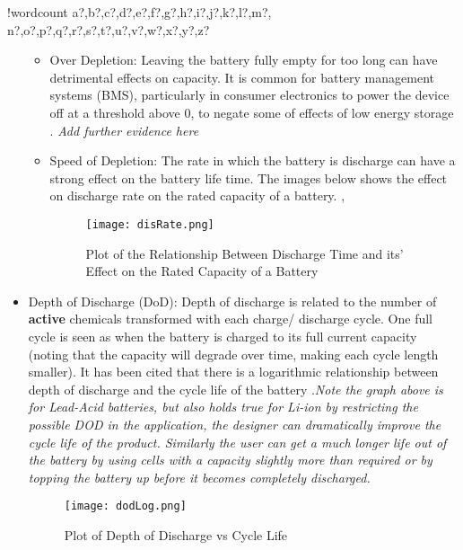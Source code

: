 \documentclass[fontsize=9.5pt]{extarticle}
\providecommand{\tightlist}{%
  \setlength{\itemsep}{0pt}\setlength{\parskip}{0pt}}
\newcounter{words}
\newenvironment{counted}{%
  \setcounter{words}{0}
  \SearchList!{wordcount}{\stepcounter{words}}
    {a?,b?,c?,d?,e?,f?,g?,h?,i?,j?,k?,l?,m?,
    n?,o?,p?,q?,r?,s?,t?,u?,v?,w?,x?,y?,z?}
  \UndoBoundary{'}
  \SearchOrder{p;}}{%
  \StopSearching}
\begin{document}
\begin{counted}
\begin{itemize}
  \begin{itemize}
  \tightlist
  \item
    Over Depletion: Leaving the battery fully empty for too long can
    have detrimental effects on capacity. It is common for battery
    management systems (BMS), particularly in consumer electronics to
    power the device off at a threshold above 0, to negate some of
    effects of low energy storage \cite{Prematur82:online}. \emph{Add
    further evidence here}
  \item
    Speed of Depletion: The rate in which the battery is discharge can
    have a strong effect on the battery life time. The images below
    shows the effect on discharge rate on the rated capacity of a
    battery. \cite{BatteryL10:online},\cite{Effectso69:online}

    \begin{figure}[H]
       \centering
       \texttt{[image: disRate.png]}
       \caption{Plot of the Relationship Between Discharge Time and its' Effect on the Rated Capacity of a Battery \cite{Effectso69:online}}
       \label{disRate}
     \end{figure}
  \end{itemize}
\item
  Depth of Discharge (DoD): Depth of discharge is related to the number
  of \textbf{active} chemicals transformed with each charge/ discharge
  cycle. One full cycle is seen as when the battery is charged to its
  full current capacity (noting that the capacity will degrade over
  time, making each cycle length smaller). It has been cited that there
  is a logarithmic relationship between depth of discharge and the cycle
  life of the battery \cite{BatteryL10:online}.\emph{Note the graph
  above is for Lead-Acid batteries, but also holds true for Li-ion by
  restricting the possible DOD in the application, the designer can
  dramatically improve the cycle life of the product. Similarly the user
  can get a much longer life out of the battery by using cells with a
  capacity slightly more than required or by topping the battery up
  before it becomes completely discharged. \cite{BatteryL10:online}}

  \begin{figure}[H]
    \centering
    \texttt{[image: dodLog.png]}
    \caption{Plot of Depth of Discharge vs Cycle Life \cite{BatteryL10:online}}
    \label{dodLog}
  \end{figure}


\end{itemize}
\end{counted}
\end{document}
